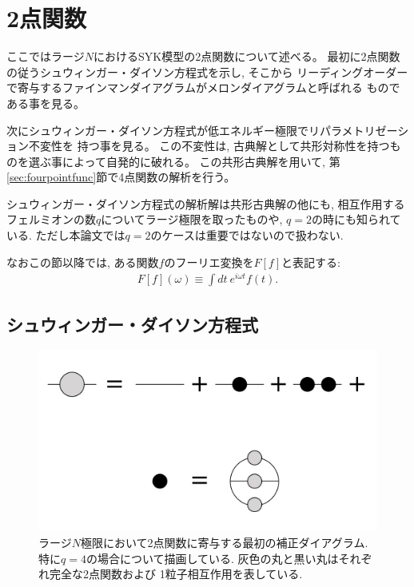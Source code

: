 \section{2点関数\label{sec:twopointfunc}}
ここではラージ$N$におけるSYK模型の2点関数について述べる。
最初に2点関数の従うシュウィンガー・ダイソン方程式を示し, そこから
リーディングオーダーで寄与するファインマンダイアグラムがメロンダイアグラムと呼ばれる
ものである事を見る。

次にシュウィンガー・ダイソン方程式が低エネルギー極限でリパラメトリゼーション不変性を
持つ事を見る。
この不変性は, 古典解として共形対称性を持つものを選ぶ事によって自発的に破れる。
この共形古典解を用いて, 第\ref{sec:fourpointfunc}節で4点関数の解析を行う。

シュウィンガー・ダイソン方程式の解析解は共形古典解の他にも, 
相互作用するフェルミオンの数$q$についてラージ極限を取ったものや, $q=2$の時にも知られている. 
ただし本論文では$q=2$のケースは重要ではないので扱わない. 

なおこの節以降では, ある関数$f$のフーリエ変換を$F[f]$と表記する:
\begin{align}
	F[f](\omega) \equiv \int dt\ e^{i\omega t}f(t).
\end{align}

\subsection{シュウィンガー・ダイソン方程式}
\begin{figure}[ht]
  \centering
  \includegraphics[width=14cm]{figures/melonDiagram}
  \caption{ラージ$N$極限において2点関数に寄与する最初の補正ダイアグラム.
  特に$q=4$の場合について描画している. 灰色の丸と黒い丸はそれぞれ完全な2点関数および
  1粒子相互作用を表している.}
  \label{fig:melonDiagram}
\end{figure}

